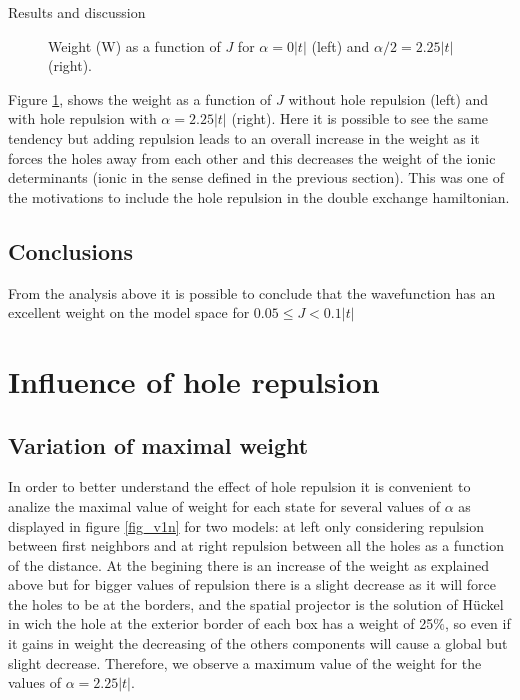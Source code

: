 \documentclass[12pt,twoside]{report}
\begin{document}
\begin{chapter}{Results and discussion}
\begin{figure}[h!]
\begin{minipage}{0.4\textwidth}
		\end{minipage}
		\caption{\label{fig_0_225} Weight (W) as a function of $J$ for $\alpha = 0 |t|$ (left) and $\alpha \slash 2 = 2.25|t|$ (right). }
	\end{figure}
	
	Figure \ref{fig_0_225}, shows the weight as a function of $J$ without hole
	repulsion (left) and with hole repulsion with $\alpha=2.25|t|$ (right). Here
	it is possible to see the same tendency but adding repulsion leads to an
	overall increase in the weight as it forces the holes away from each other
	and this decreases the weight of the ionic determinants (ionic in the sense defined in the previous section). This was one of the
	motivations to include the hole repulsion in the double exchange
	hamiltonian.

	\subsection{Conclusions}

	From the analysis above it is possible to conclude that the wavefunction has
	an excellent weight on the model space for $0.05 \leq J < 0.1|t|$

	\section{Influence of hole repulsion}

	\subsection{Variation of maximal weight}

	In order to better understand the effect of hole repulsion it is convenient
	to analize the maximal value of weight for each state for several values of
	$\alpha$ as displayed in figure \ref{fig_v1n} for two models: at left only
	considering repulsion between first neighbors and at right repulsion between
	all the holes as a function of the distance. At the begining there is an
	increase of the weight as explained above but for bigger values of repulsion
	there is a slight decrease as it will force the holes to be at the borders,
	and the spatial projector is the solution of Hückel in wich the hole at the
	exterior border of each box has a weight of 25$\%$, so even if it gains in
	weight the decreasing of the others components will cause a global but
	slight decrease. Therefore, we observe a maximum value of the weight for the
	values of $\alpha=2.25|t|$.
	

\end{chapter}
\end{document}
